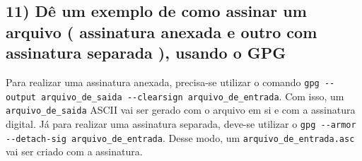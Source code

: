 \documentclass[12pt]{article}
\begin{document}
\subsection*{11) Dê um exemplo de como assinar um arquivo ( assinatura anexada e outro com assinatura separada ), usando o GPG}
Para realizar uma assinatura anexada, precisa-se utilizar o comando \break \lstinline{gpg --output arquivo_de_saida --clearsign arquivo_de_entrada}. Com isso, um \break \lstinline{arquivo_de_saida} ASCII vai ser gerado com o arquivo em si e com a assinatura digital. Já para realizar uma assinatura separada, deve-se utilizar o \break \lstinline{gpg --armor --detach-sig arquivo_de_entrada}. Desse modo, um \lstinline{arquivo_de_entrada.asc} vai ser criado com a assinatura.
\end{document}
